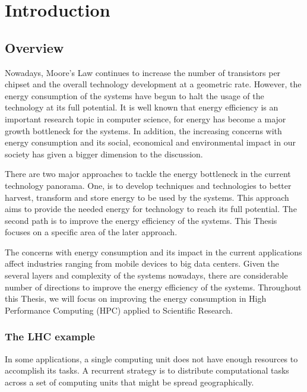 \chapter{Introduction}

\section{Overview}
Nowadays, Moore's Law continues to increase the number of transistors per
chipset and the overall technology development at a geometric rate. However, the energy
consumption of the systems have begun to halt the usage of the technology at its
full potential. It is well known that energy efficiency is an important
research topic in computer science, for energy has become a major growth
bottleneck for the systems. In addition, the increasing concerns with energy consumption and
its social, economical and environmental impact in our society has given a
bigger dimension to the discussion.


There are two major approaches to tackle the energy bottleneck in the current
technology panorama. One, is to develop techniques and technologies to better harvest, 
transform and store energy to be used by the systems. This approach aims to provide the
needed energy for technology to reach its full potential. The second path is to improve 
the energy efficiency of the systems. This Thesis focuses on a specific area of
the later approach. 

The concerns with energy consumption and its impact in the current
applications affect industries ranging from mobile devices to big data centers. 
Given the several layers and complexity of the systems nowadays, there are 
considerable number of directions to improve the energy efficiency of the
systems. Throughout this Thesis, we will focus on improving the energy
consumption in High Performance Computing (HPC) applied to Scientific Research.


\subsection{The LHC example}
In some applications, a single computing unit does not have enough resources to
accomplish its tasks. A recurrent strategy is to distribute computational tasks
across a set of computing units that might be spread geographically.

